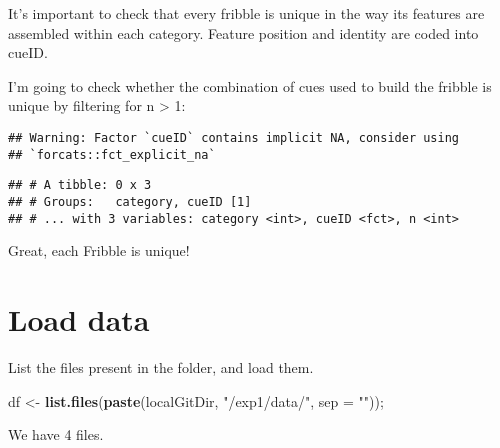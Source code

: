 \documentclass[
]{article}
\newenvironment{Shaded}{\begin{snugshade}}{\end{snugshade}}
\newcommand{\DataTypeTok}[1]{\textcolor[rgb]{0.13,0.29,0.53}{#1}}
\newcommand{\DecValTok}[1]{\textcolor[rgb]{0.00,0.00,0.81}{#1}}
\newcommand{\KeywordTok}[1]{\textcolor[rgb]{0.13,0.29,0.53}{\textbf{#1}}}
\newcommand{\NormalTok}[1]{#1}
\newcommand{\OperatorTok}[1]{\textcolor[rgb]{0.81,0.36,0.00}{\textbf{#1}}}
\newcommand{\StringTok}[1]{\textcolor[rgb]{0.31,0.60,0.02}{#1}}
\begin{document}
It's important to check that every fribble is unique in the way its
features are assembled within each category. Feature position and
identity are coded into cueID.

I'm going to check whether the combination of cues used to build the
fribble is unique by filtering for n \textgreater{} 1:

\begin{Shaded}
\end{Shaded}

\begin{verbatim}
## Warning: Factor `cueID` contains implicit NA, consider using
## `forcats::fct_explicit_na`
\end{verbatim}

\begin{verbatim}
## # A tibble: 0 x 3
## # Groups:   category, cueID [1]
## # ... with 3 variables: category <int>, cueID <fct>, n <int>
\end{verbatim}

Great, each Fribble is unique!

\hypertarget{load-data}{%
\section{Load data}\label{load-data}}

List the files present in the folder, and load them.

\begin{Shaded}
\begin{Highlighting}[]
\NormalTok{df <-}\StringTok{ }\KeywordTok{list.files}\NormalTok{(}\KeywordTok{paste}\NormalTok{(localGitDir, }\StringTok{"/exp1/data/"}\NormalTok{, }\DataTypeTok{sep =} \StringTok{""}\NormalTok{)); }
\end{Highlighting}
\end{Shaded}

We have 4 files.
\end{document}
